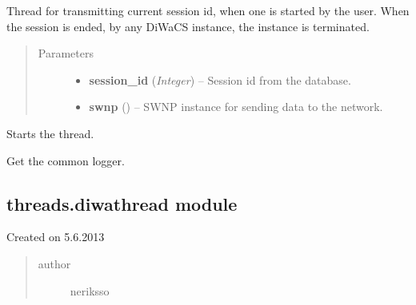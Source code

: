 \documentclass[letterpaper,10pt,english]{sphinxmanual}
\begin{document}
\begin{fulllineitems}
\label{threads:threads.current.CURRENT_SESSION}
Thread for transmitting current session id, when one is started by
the user.  When the session is ended, by any DiWaCS instance, the
instance is terminated.
\begin{quote}\begin{description}
\item[{Parameters}] \leavevmode\begin{itemize}
\item {} 
\textbf{session\_id} (\emph{Integer}) -- Session id from the database.

\item {} 
\textbf{swnp} ({\hyperref[swnp:swnp.SWNP]{}}) -- SWNP instance for sending data to the network.

\end{itemize}

\end{description}\end{quote}

\begin{fulllineitems}
\label{threads:threads.current.CURRENT_SESSION.run}
Starts the thread.

\end{fulllineitems}


\end{fulllineitems}


\begin{fulllineitems}
\label{threads:threads.current.logger}
Get the common logger.

\end{fulllineitems}



\subsection{threads.diwathread module}
\label{threads:module-threads.diwathread}\label{threads:threads-diwathread-module}
Created on 5.6.2013
\begin{quote}\begin{description}
\item[{author}] \leavevmode
neriksso

\end{description}\end{quote}
\end{document}
